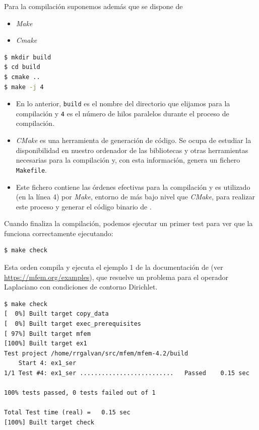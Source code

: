 Para la compilación suponemos además que se dispone de
\begin{itemize}
\item \textit{Make}
\item \textit{Cmake}
\end{itemize}

\begin{lstlisting}[language=sh]
$ mkdir build
$ cd build
$ cmake ..
$ make -j 4
\end{lstlisting}

\begin{itemize}
\item En lo anterior, \texttt{build} es el nombre del directorio que
  elijamos para la compilación y \texttt{4} es el número de hilos
  paralelos durante el proceso de compilación.

\item \textit{CMake} es una
  herramienta de generación de código. Se ocupa de estudiar la
  disponibilidad en nuestro ordenador de las bibliotecas y otras
  herramientas necesarias para la compilación y, con esta información,
  genera un fichero \texttt{Makefile}.

\item Este fichero contiene las órdenes efectivas para la compilación
  y es utilizado (en la línea 4) por \textit{Make}, entorno de más
  bajo nivel que \textit{CMake}, para realizar este proceso y generar
  el código binario de \mfem.
\end{itemize}

Cuando finaliza la compilación, podemos ejecutar un primer test para
ver que la \mfem funciona correctamente ejecutando:
\begin{lstlisting}[language=sh]
$ make check
\end{lstlisting}
Esta orden compila y ejecuta el ejemplo 1 de la documentación de \mfem
(ver \url{https://mfem.org/examples}), que resuelve un problema para
el operador Laplaciano con condiciones de contorno Dirichlet.
\begin{lstlisting}
$ make check
[  0%] Built target copy_data
[  0%] Built target exec_prerequisites
[ 97%] Built target mfem
[100%] Built target ex1
Test project /home/rrgalvan/src/mfem/mfem-4.2/build
    Start 4: ex1_ser
1/1 Test #4: ex1_ser ..........................   Passed    0.15 sec

100% tests passed, 0 tests failed out of 1

Total Test time (real) =   0.15 sec
[100%] Built target check
\end{lstlisting}


